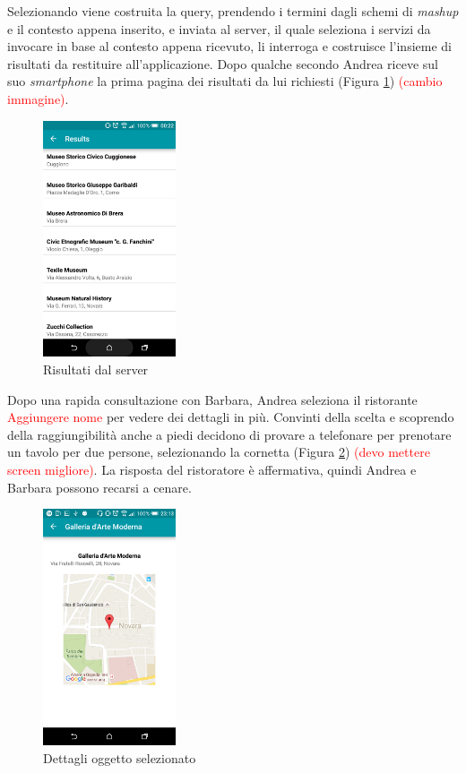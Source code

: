 Selezionando  viene costruita la query, prendendo i termini dagli schemi di \emph{mashup} e il contesto appena inserito, e inviata al server, il quale seleziona i servizi da invocare in base al contesto appena ricevuto, li interroga e costruisce l'insieme di risultati da restituire all'applicazione. Dopo qualche secondo Andrea riceve sul suo \emph{smartphone} la prima pagina dei risultati da lui richiesti (Figura \ref{fig:usecase-results}) \textcolor{red}{(cambio immagine)}.

\begin{figure}[H]
	\centering
	\includegraphics[width=0.35\textwidth]{4-progettazione-alto-livello/Immagini/results_caso_d'uso.png}
	\caption{Risultati dal server}\label{fig:usecase-results}
\end{figure} 

Dopo una rapida consultazione con Barbara, Andrea seleziona il ristorante \textcolor{red}{Aggiungere nome} per vedere dei dettagli in più. Convinti della scelta e scoprendo della raggiungibilità anche a piedi decidono di provare a telefonare per prenotare un tavolo per due persone, selezionando la cornetta (Figura \ref{fig:usecase-details}) \textcolor{red}{(devo mettere screen migliore)}. La risposta del ristoratore è affermativa, quindi Andrea e Barbara possono recarsi a cenare. %
\begin{figure}[H]
	\centering
	\includegraphics[width=0.35\textwidth]{4-progettazione-alto-livello/Immagini/details_caso_d'uso.png}
	\caption{Dettagli oggetto selezionato}\label{fig:usecase-details}
\end{figure} 

